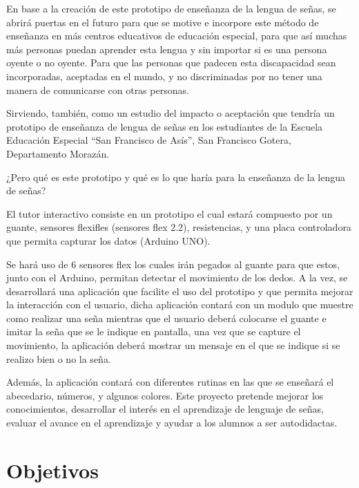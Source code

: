 \documentclass[12pt]{report}%
\begin{document}
En base a la creación de este prototipo de enseñanza de la lengua de señas, se abrirá puertas en el futuro para que se motive e incorpore este método de enseñanza en más centros educativos de educación especial, para que  así muchas más personas puedan aprender esta lengua y sin importar si es una persona oyente o no oyente.  
Para que las personas que padecen esta discapacidad sean incorporadas, aceptadas en el mundo, y no discriminadas por no tener una manera de comunicarse con otras personas. 

Sirviendo, también, como un estudio del impacto o aceptación que tendría un prototipo de enseñanza de lengua de señas en los estudiantes de la Escuela Educación Especial “San Francisco de Asís”, San Francisco Gotera, Departamento Morazán.

¿Pero qué es este prototipo y qué es lo que haría para la enseñanza de la lengua de señas?

El tutor interactivo consiste en un prototipo el cual estará compuesto por  un guante,  sensores flexifles (sensores flex 2.2), resistencias, y una placa controladora que permita capturar los datos (Arduino UNO). 
 
Se hará uso de 6  sensores flex los cuales irán pegados al guante para que estos, junto con el Arduino, permitan detectar el movimiento de los dedos. A la vez, se desarrollará una aplicación que facilite el uso del prototipo y que permita mejorar la interacción con el usuario, dicha aplicación contará con un modulo que muestre como realizar una seña mientras que el usuario deberá colocarse el guante e imitar la seña que se le indique en  pantalla, una vez que se capture el movimiento, la aplicación deberá mostrar un mensaje en el que se indique si se realizo bien o no la seña.

Además, la aplicación contará con diferentes rutinas en las que se enseñará el abecedario, números, y algunos colores. Este proyecto pretende mejorar los conocimientos, desarrollar el interés en el aprendizaje de lenguaje de señas, evaluar el avance en el aprendizaje y ayudar a los alumnos a ser autodidactas. 

\newpage
\section{Objetivos}
\end{document}
